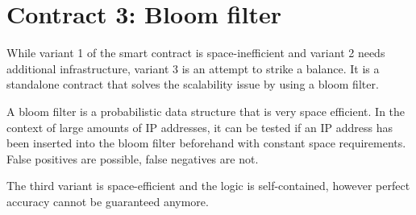 \section{Contract 3: Bloom filter}

While variant 1 of the smart contract is space-inefficient and variant 2 needs additional infrastructure, variant 3 is an attempt to strike a balance. It is a standalone contract that solves the scalability issue by using a bloom filter.

A bloom filter is a probabilistic data structure that is very space efficient. In the context of large amounts of IP addresses, it can be tested if an IP address has been inserted into the bloom filter beforehand with constant space requirements. False positives are possible, false negatives are not.

The third variant is space-efficient and the logic is self-contained, however perfect accuracy cannot be guaranteed anymore.
